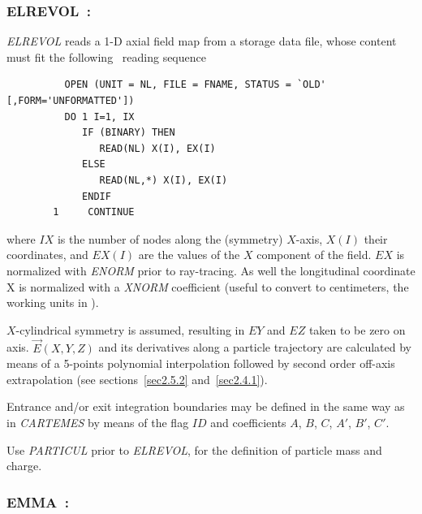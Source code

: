 {\newpage

\subsubsection*{ELREVOL~: \ELREVOLTitl}  \label{ELREVOL}
\medskip

\textsl{ELREVOL}  reads a 1-D axial field map from a storage data file,
whose content must fit the following \FORTRAN\ reading sequence  


{\footnotesize
\begin{verbatim}
	      OPEN (UNIT = NL, FILE = FNAME, STATUS = `OLD' [,FORM='UNFORMATTED'])
	      DO 1 I=1, IX
	         IF (BINARY) THEN 
	            READ(NL) X(I), EX(I)
	         ELSE
	            READ(NL,*) X(I), EX(I)
	         ENDIF 
        1     CONTINUE
\end{verbatim}}%
\medskip
  
\noindent where $IX$ is the number of nodes along the (symmetry) $X$-axis, $X(I)$ their 
coordinates, and $EX(I)$ are the values of the $X$ component of the field. $EX$ is 
normalized with \textsl{ENORM} prior to ray-tracing. As well the longitudinal coordinate  X is normalized with 
a  \textsl{XNORM} coefficient (useful to convert to centimeters, the working units in  \zgoubi). 


\medskip

\noindent$X$-cylindrical symmetry is assumed, resulting in $EY$
and $EZ$ taken to be zero on axis. $ \vec  E(X,Y,Z) $ and its derivatives along a particle
trajectory are calculated by means of a 5-points polynomial interpolation followed by second 
order off-axis extrapolation (see sections~\ref{sec2.5.2} and~\ref{sec2.4.1}).  

\medskip

\noindent Entrance and/or exit integration boundaries may be defined in the same way 
as in \textsl{CARTEMES} by means of the flag $ID$ and coefficients  
$A$, $B$, $C$, $A'$, $B'$, $C'$.  
\medskip

\noindent Use \textsl{PARTICUL} prior to \textsl{ELREVOL}, for the
 definition of particle mass and charge.



\newpage

\subsubsection*{EMMA~: \EMMATitl} \label{EMMA} 
\medskip

}

